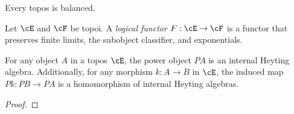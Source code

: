 \documentclass[article,10pt,oneside]{memoir}
\begin{document}
\begin{cor}
  Every topos is balanced.
\end{cor}

\begin{defn}
  Let $\cE$ and $\cF$ be topoi.
  A \emph{logical functor} $F : \cE \to \cF$ is a functor that preserves finite limits, the subobject classifier, and exponentials.
\end{defn}

\begin{thm}
  For any object $A$ in a topos $\cE$, the power object $PA$ is an internal Heyting algebra.
  Additionally, for any morphism $k : A \to B$ in $\cE$, the induced map $Pk : PB \to PA$ is a homomorphism of internal Heyting algebras.
\end{thm}
\begin{proof}
  \todo{}
\end{proof}



\end{document}
